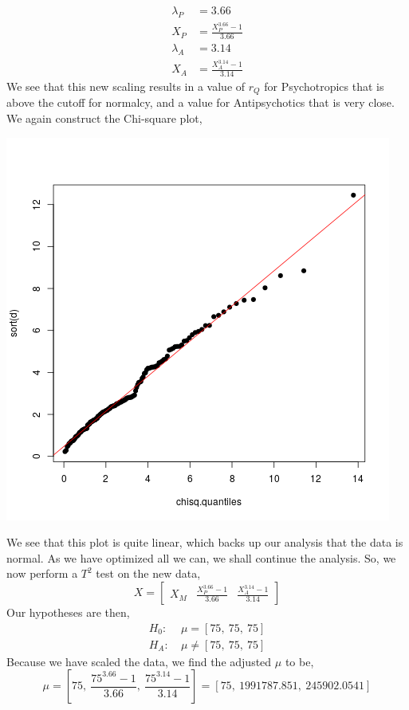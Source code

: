 \documentclass[letterpaper,10pt]{article}
\begin{document}
\begin{enumerate}
\begin{center}
\end{center}
\begin{align*}
\lambda_P &= 3.66\\
X_P &= \frac{X_P^{3.66}-1}{3.66}\\
\lambda_A &= 3.14\\
X_A &= \frac{X_A^{3.14}-1}{3.14}
\end{align*}
We see that this new scaling results in a value of $r_Q$ for Psychotropics that is above the cutoff for normalcy, and a value for Antipsychotics that is very close. We again construct the Chi-square plot,
\begin{center}
\includegraphics[scale=.75]{bestchi.png}
\end{center}
We see that this plot is quite linear, which backs up our analysis that the data is normal. As we have optimized all we can, we shall continue the analysis. So, we now perform a $T^2$ test on the new data,
\[X=\begin{bmatrix}
X_M & \frac{X_P^{3.66}-1}{3.66} & \frac{X_A^{3.14}-1}{3.14}
\end{bmatrix}\]
Our hypotheses are then,
\begin{align*}
H_0:\ & \mu=[75,\ 75,\ 75]\\
H_A:\ & \mu \neq [75,\ 75,\ 75]
\end{align*}
Because we have scaled the data, we find the adjusted $\mu$ to be,
\[\mu=[75,\ \frac{75^{3.66}-1}{3.66},\ \frac{75^{3.14}-1}{3.14}]=[75,\ 1991787.851,\ 245902.0541]\]

\end{enumerate}
\end{document}
